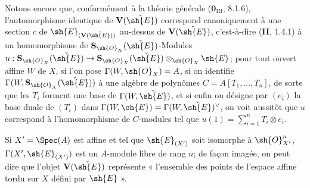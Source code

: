 
Notons encore que, conformément à la théorie générale ($\mathbf{0}_{\mathrm{III}}$, 8.1.6), l'automorphisme identique de $\mathbf V(\check{\sh{E}})$ correspond canoniquement à une section $c$ de $\sh{E}_{(\mathbf V(\check{\sh{E}}))}$ au-dessus de $\mathbf V(\check{\sh{E}})$, c'est-à-dire (\textbf{II}, 1.4.1) à un homomorphisme de $\mathbf S_{\sh{O}_X}(\check{\sh{E}})$-Modules $u:\mathbf S_{\sh{O}_X}(\check{\sh{E}})\to\mathbf S_{\sh{O}_X}(\check{\sh{E}})\otimes_{\sh{O}_X}\sh{E}$; pour tout ouvert affine $W$ de $X$, si l'on pose $\Gamma(W,\sh{O}_X)=A$, si on identifie $\Gamma(W,\mathbf S_{\sh{O}_X}(\check{\sh{E}}))$ à une algèbre de polynômes $C=A[T_1,\ldots,T_n]$, de sorte que les $T_i$ forment une base de $\Gamma(W,\check{\sh{E}})$, et si enfin on désigne par $(e_i)$ la base duale de $(T_i)$ dans $\Gamma(W,\sh{E})=\Gamma(W,\check{\sh{E}})^\vee$, on voit aussitôt que $u$ correspond à l'homomorphisme de $C$-modules tel que $u(1)=\sum_{i=1}^n T_i\otimes e_i$.

Si $X'=\Spec(A)$ est affine et tel que $\sh{E}_{(X')}$ soit isomorphe à $\sh{O}_{X'}^n$, $\Gamma(X',\sh{E}_{(X')})$ est un $A$-module libre de rang $n$; de façon imagée, on peut dire que l'objet $\mathbf V(\check{\sh{E}})$ représente « l'ensemble des points de l'espace affine tordu sur $X$ défini par $\sh{E}$ ».

